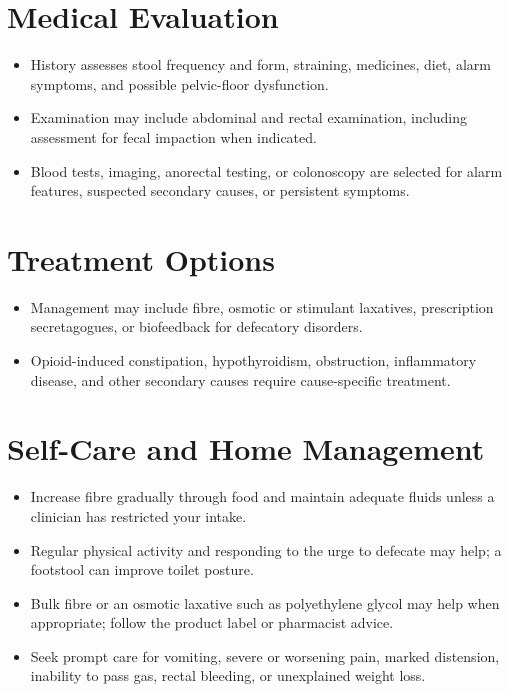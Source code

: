 \section*{Medical Evaluation}
\begin{itemize}
  \item History assesses stool frequency and form, straining, medicines, diet, alarm symptoms, and possible pelvic-floor dysfunction.
  \item Examination may include abdominal and rectal examination, including assessment for fecal impaction when indicated.
  \item Blood tests, imaging, anorectal testing, or colonoscopy are selected for alarm features, suspected secondary causes, or persistent symptoms.
\end{itemize}

\section*{Treatment Options}
\begin{itemize}
  \item Management may include fibre, osmotic or stimulant laxatives, prescription secretagogues, or biofeedback for defecatory disorders.
  \item Opioid-induced constipation, hypothyroidism, obstruction, inflammatory disease, and other secondary causes require cause-specific treatment.
\end{itemize}

\section*{Self-Care and Home Management}
\begin{itemize}
  \item Increase fibre gradually through food and maintain adequate fluids unless a clinician has restricted your intake.
  \item Regular physical activity and responding to the urge to defecate may help; a footstool can improve toilet posture.
  \item Bulk fibre or an osmotic laxative such as polyethylene glycol may help when appropriate; follow the product label or pharmacist advice.
  \item Seek prompt care for vomiting, severe or worsening pain, marked distension, inability to pass gas, rectal bleeding, or unexplained weight loss.
\end{itemize}

